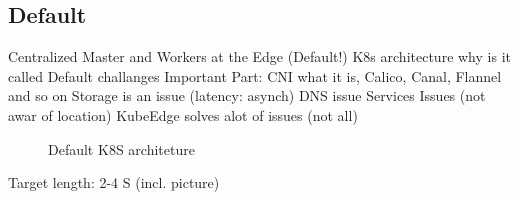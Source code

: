 \documentclass[MSC,Master,english]{twbook}%
\begin{document}
\subsection{Default}
Centralized Master and Workers at the Edge (Default!) K8s architecture
why is it called Default
challanges
Important Part: \ac{CNI}
what it is, Calico, Canal, Flannel and so on
Storage is an issue (latency: asynch)
DNS issue
Services Issues (not awar of location)
KubeEdge solves alot of issues (not all)
\begin{figure}[h]
    \centering
    \caption{Default \ac{K8S} architeture}
    \label{fig:default-k8s}
\end{figure}


Target length: 2-4 S (incl. picture)
\end{document}
